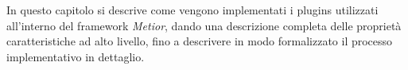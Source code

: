 In questo capitolo si descrive come vengono implementati i plugins utilizzati all'interno del framework \emph{Metior},
dando una descrizione completa delle proprietà caratteristiche ad alto livello, fino a descrivere in modo formalizzato
il processo implementativo in dettaglio.
